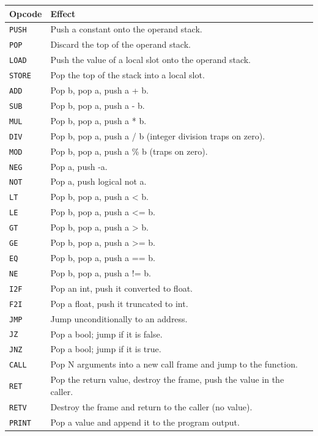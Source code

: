 \begin{longtable}{@{}lp{}@{}}\toprule
\textbf{Opcode} & \textbf{Effect}\\ \midrule\endhead
\texttt{PUSH} & Push a constant onto the operand stack.\\
\texttt{POP} & Discard the top of the operand stack.\\
\texttt{LOAD} & Push the value of a local slot onto the operand stack.\\
\texttt{STORE} & Pop the top of the stack into a local slot.\\
\texttt{ADD} & Pop b, pop a, push a + b.\\
\texttt{SUB} & Pop b, pop a, push a - b.\\
\texttt{MUL} & Pop b, pop a, push a * b.\\
\texttt{DIV} & Pop b, pop a, push a / b (integer division traps on zero).\\
\texttt{MOD} & Pop b, pop a, push a \% b (traps on zero).\\
\texttt{NEG} & Pop a, push -a.\\
\texttt{NOT} & Pop a, push logical not a.\\
\texttt{LT} & Pop b, pop a, push a \textless{} b.\\
\texttt{LE} & Pop b, pop a, push a \textless{}= b.\\
\texttt{GT} & Pop b, pop a, push a \textgreater{} b.\\
\texttt{GE} & Pop b, pop a, push a \textgreater{}= b.\\
\texttt{EQ} & Pop b, pop a, push a == b.\\
\texttt{NE} & Pop b, pop a, push a != b.\\
\texttt{I2F} & Pop an int, push it converted to float.\\
\texttt{F2I} & Pop a float, push it truncated to int.\\
\texttt{JMP} & Jump unconditionally to an address.\\
\texttt{JZ} & Pop a bool; jump if it is false.\\
\texttt{JNZ} & Pop a bool; jump if it is true.\\
\texttt{CALL} & Pop N arguments into a new call frame and jump to the function.\\
\texttt{RET} & Pop the return value, destroy the frame, push the value in the caller.\\
\texttt{RETV} & Destroy the frame and return to the caller (no value).\\
\texttt{PRINT} & Pop a value and append it to the program output.\\

\end{longtable}
